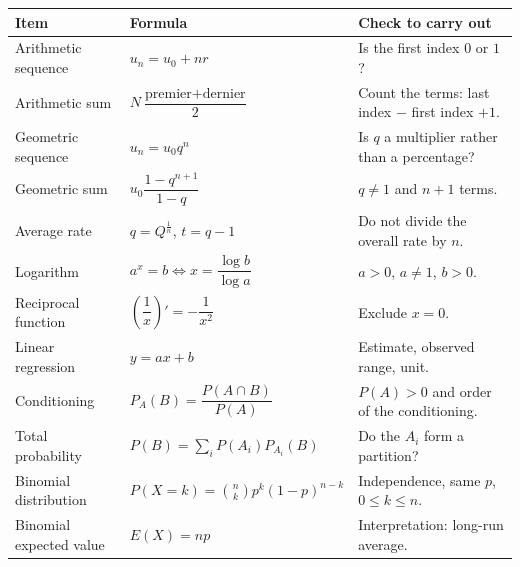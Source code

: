 \begin{longtable}{p{}p{}p{}}
\toprule
Item & Formula & Check to carry out\\
\midrule
Arithmetic sequence & $u_n=u_0+nr$ & Is the first index $0$ or $1$?\\
Arithmetic sum & $N\dfrac{\text{premier}+\text{dernier}}2$ & Count the terms: last index $-$ first index $+1$.\\
Geometric sequence & $u_n=u_0q^n$ & Is $q$ a multiplier rather than a percentage?\\
Geometric sum & $u_0\dfrac{1-q^{n+1}}{1-q}$ & $q\neq1$ and $n+1$ terms.\\
Average rate & $q=Q^{\frac1n}$, $t=q-1$ & Do not divide the overall rate by $n$.\\
Logarithm & $a^x=b\iff x=\dfrac{\log b}{\log a}$ & $a>0$, $a\neq1$, $b>0$.\\
Reciprocal function & $\left(\dfrac1x\right)'=-\dfrac1{x^2}$ & Exclude $x=0$.\\
Linear regression & $y=ax+b$ & Estimate, observed range, unit.\\
Conditioning & $P_A(B)=\dfrac{P(A\cap B)}{P(A)}$ & $P(A)>0$ and order of the conditioning.\\
Total probability & $P(B)=\sum_iP(A_i)P_{A_i}(B)$ & Do the $A_i$ form a partition?\\
Binomial distribution & $P(X=k)=\binom nkp^k(1-p)^{n-k}$ & Independence, same $p$, $0\leq k\leq n$.\\
Binomial expected value & $E(X)=np$ & Interpretation: long-run average.\\
\bottomrule
\end{longtable}
